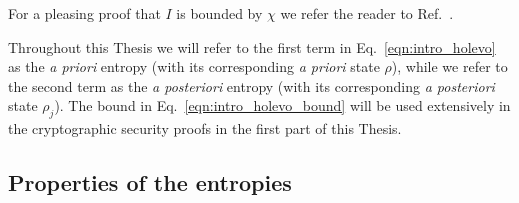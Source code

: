 \noindent For a pleasing proof that $I$ is bounded by $\chi$ we refer the reader to Ref.~\cite{Nielsen2010}. 

Throughout this Thesis we will refer to the first term in Eq.~\ref{eqn:intro_holevo} as the \emph{a priori} entropy (with its corresponding \emph{a priori} state $\rho$), while we refer to the second term as the \emph{a  posteriori} entropy (with its corresponding \emph{a posteriori} state $\rho_j$). The bound in Eq.~\ref{eqn:intro_holevo_bound} will be used extensively in the cryptographic security proofs in the first part of this Thesis.


\FloatBarrier
\subsection{Properties of the entropies}






\iffalse
%
%
each received $\rho\left[\phi_{j, m}^{\left(B, C\right)}\right]$ and receives complex phase outcome $x_{B,C}\in\mathbb{C}$. In other words, they perform the POVM
\begin{equation}
E\left[x\right] := \otimes_{j=1}^L E_j\left[x\right] \qq{with} E_j\left[x\right] := \frac{1}{\sqrt{\pi}} \ket{x}_j\bra{x}_j
\end{equation}
with $x \in \mathbb{C}$. 
\fi







